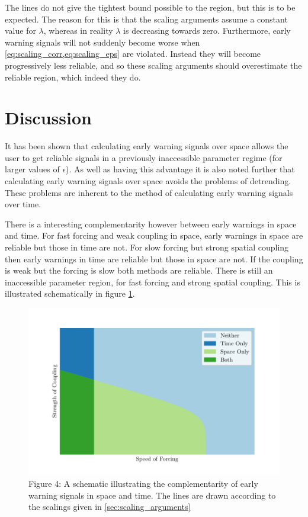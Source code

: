 The lines do not give the tightest bound possible to the region, but this is to be expected. The reason for this is that the scaling arguments assume
a constant value for $\lambda$, whereas in reality $\lambda$ is decreasing towards zero. Furthermore, early warning signals will not suddenly become worse
when \cref{eq:scaling_corr,eq:scaling_eps} are violated. Instead they will become progressively less reliable, and so these scaling arguments should overestimate
the reliable region, which indeed they do.

\section{Discussion}
It has been shown that calculating early warning signals over space allows the user to get reliable
signals in a previously inaccessible parameter regime (for larger values of $\epsilon$).  As well
as having this advantage it is also noted further that calculating early warning signals over space avoids 
the problems of detrending. These problems are inherent to the method of calculating early warning signals over
time.

There is a interesting complementarity however between early warnings in space and time. For fast forcing
and weak coupling in space, early warnings in space are reliable but those in time are not. For slow forcing
but strong spatial coupling then early warnings in time are reliable but those in space are not. If the
coupling is weak but the forcing is slow both methods are reliable. There is still an inaccessible parameter
region, for fast forcing and strong spatial coupling. This is illustrated schematically in figure
\cref{fig:idealised_plot}.
\begin{figure}
  \centering
  \includegraphics[width=\textwidth,keepaspectratio]{idealised_plot}
  \caption[A schematic showing the complementarity of spatial and temporal early warning signals]{Figure 4: A schematic illustrating the complementarity of early warning signals in space and time.
    The lines are drawn according to the scalings given in \cref{sec:scaling_arguments}}
  \label{fig:idealised_plot}
\end{figure}

